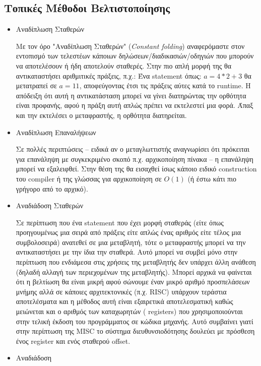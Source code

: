 \subsection{Τοπικές Μέθοδοι Βελτιστοποίησης}

\begin{itemize} \item Αναδίπλωση Σταθερών

Με τον όρο "Αναδίπλωση Σταθερών" (\textit{Constant folding}) αναφερόμαστε στον
εντοπισμό των τελεστέων κάποιων δηλώσεων/διαδικασιών/οδηγιών που μπορούν να
αποτελέσουν ή ήδη αποτελούν σταθερές. Στην πιο απλή μορφή της θα αντικαταστήσει
αριθμιτικές πράξεις, π.χ.: Ένα statement όπως: $ a = 4 * 2 + 3 $ θα μετατραπεί
σε $ a = 11 $, αποφεύγοντας έτσι τις πράξεις αύτες κατά το runtime. Η απόδειξη
ότι αυτή η αντικατάσταση μπορεί να γίνει διατηρώντας την ορθότητα είναι
προφανής, αφού η πράξη αυτή απλώς πρέπει να εκτελεστεί μια φορά. Άπαξ και την
εκτελέσει ο μεταφραστής, η ορθότητα διατηρείται.

\item Αναδίπλωση Επαναλήψεων

Σε πολλές περιπτώσεις – ειδικά αν ο μεταγλωττιστής αναγνωρίσει ότι πρόκειται για
επανάληψη με συγκεκριμένο σκοπό π.χ. αρχικοποίηση πίνακα – η επανάληψη μπορεί να
εξαλειφθεί. Στην θέση της θα εισαχθεί ίσως κάποιο ειδικό construction του
compiler ή της γλώσσας για αρχικοποίηση σε $O(1)$ (ή έστω κάτι πιο γρήγορο από
το αρχικό).

\item Αναδιάδοση Σταθερών

Σε περίπτωση που ένα statement που έχει μορφή σταθεράς (είτε όπως προηγουμένως 
μια σειρά από πράξεις είτε απλώς ένας αριθμός είτε τέλος μια συμβολοσειρά) 
ανατεθεί σε μια μεταβλητή, τότε ο μεταφραστής μπορεί να την αντικαταστήσει με 
την ίδια την σταθερά. Αυτό μπορεί να συμβεί μόνο στην περίπτωση που ενδιάμεσα 
στις χρήσεις της μεταβλητής δεν υπάρχει άλλη ανάθεση (δηλαδή αλλαγή των 
περιεχομένων της μεταβλητής). Μπορεί αρχικά να φαίνεται ότι η βελτίωση θα είναι 
μικρή αφού σώνουμε έναν μικρό αριθμό προσπελάσεων μνήμης αλλά σε κάποιες 
αρχιτεκτονικές (π.χ. RISC) υπάρχουν τεράστια αποτελέσματα και η μέθοδος αυτή 
είναι εξαιρετικά αποτελεσματική καθώς μειώνεται και ο αριθμός των καταχωρητών (
registers) που χρησιμοποιούνται στην τελική έκδοση του προγράμματος σε κώδικα 
μηχανής. Αυτό συμβαίνει γιατί στην περίπτωση της MISC το σύστημα 
διευθυνσιοδότησης δουλεύει με πρόσθεση ένος register και ενός σταθερού offset.

\item Αναδιάδοση


\end{itemize}
